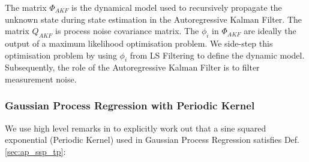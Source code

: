 The matrix $\Phi_{AKF}$ is the dynamical model used to recursively propagate the unknown state during state estimation in the Autoregressive Kalman Filter.  The matrix $Q_{AKF}$ is process noise covariance matrix. The ${\phi_i}$ in $\Phi_{AKF}$ are ideally the output of a maximum likelihood optimisation problem. We side-step this optimisation problem by using ${\phi_i}$ from LS Filtering to define the dynamic model. Subsequently, the role of the Autoregressive Kalman Filter is to filter measurement noise. 

\subsubsection{Gaussian Process Regression with Periodic Kernel} \label{sec:ap_approxSP:GPRPKernel}

We use high level remarks in \cite{solin2014} to explicitly work out that a sine squared exponential (Periodic Kernel) used in Gaussian Process Regression satisfies Def. \ref{sec:ap_ssp_tp}:

